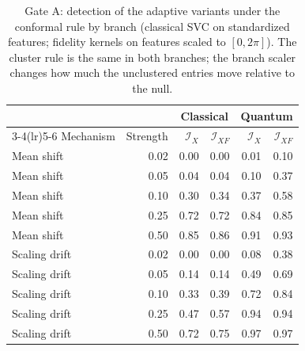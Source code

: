 \begin{table}[!tbp]
\caption{Gate A: detection of the adaptive variants under the conformal rule by branch (classical SVC on standardized features; fidelity kernels on features scaled to $[0,2\pi]$). The cluster rule is the same in both branches; the branch scaler changes how much the unclustered entries move relative to the null.}
\label{tab:s-adversarial-branch}
\centering
\scriptsize
\setlength{\tabcolsep}{3.5pt}
\begin{tabular}{@{}lrrrrr@{}}
\toprule
 & & \multicolumn{2}{c}{Classical} & \multicolumn{2}{c}{Quantum} \\
\cmidrule(lr){3-4}\cmidrule(lr){5-6}
Mechanism & Strength & $\mathcal I_X$ & $\mathcal I_{XF}$ & $\mathcal I_X$ & $\mathcal I_{XF}$ \\
\midrule
Mean shift & 0.02 & 0.00 & 0.00 & 0.01 & 0.10 \\
Mean shift & 0.05 & 0.04 & 0.04 & 0.10 & 0.37 \\
Mean shift & 0.10 & 0.30 & 0.34 & 0.37 & 0.58 \\
Mean shift & 0.25 & 0.72 & 0.72 & 0.84 & 0.85 \\
Mean shift & 0.50 & 0.85 & 0.86 & 0.91 & 0.93 \\
Scaling drift & 0.02 & 0.00 & 0.00 & 0.08 & 0.38 \\
Scaling drift & 0.05 & 0.14 & 0.14 & 0.49 & 0.69 \\
Scaling drift & 0.10 & 0.33 & 0.39 & 0.72 & 0.84 \\
Scaling drift & 0.25 & 0.47 & 0.57 & 0.94 & 0.94 \\
Scaling drift & 0.50 & 0.72 & 0.75 & 0.97 & 0.97 \\
\bottomrule
\end{tabular}
\end{table}
